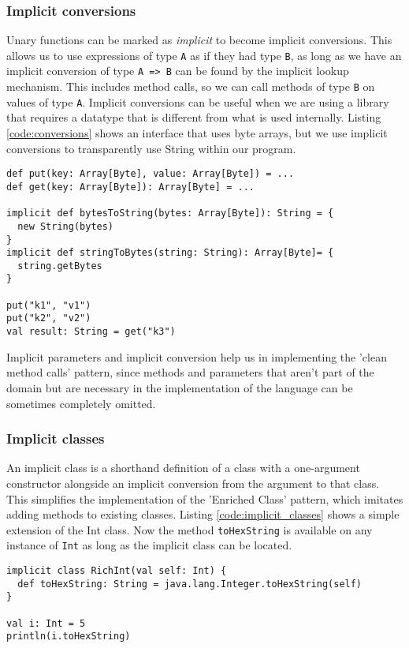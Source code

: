 \subsubsection{Implicit conversions}
Unary functions can be marked as {\it implicit} to become implicit conversions. This allows us to use expressions of type \texttt{A} as if they had type \texttt{B}, as long as we have an implicit conversion of type \texttt{A => B} can be found by the implicit lookup mechanism. This includes method calls, so we can call methods of type \texttt{B} on values of type \texttt{A}. Implicit conversions can be useful when we are using a library that requires a datatype that is different from what is used internally. Listing \ref{code:conversions} shows an interface that uses byte arrays, but we use implicit conversions to transparently use String within our program.

\begin{lstlisting}[caption=Implicit conversions, label=code:conversions, float]
def put(key: Array[Byte], value: Array[Byte]) = ...
def get(key: Array[Byte]): Array[Byte] = ...

implicit def bytesToString(bytes: Array[Byte]): String = {
  new String(bytes)
}
implicit def stringToBytes(string: String): Array[Byte]= {
  string.getBytes
}

put("k1", "v1")
put("k2", "v2")
val result: String = get("k3")
\end{lstlisting}

Implicit parameters and implicit conversion help us in implementing the 'clean method calls' pattern, since methods and parameters that aren't part of the domain but are necessary in the implementation of the language can be sometimes completely omitted.

\subsubsection{Implicit classes}
An implicit class is a shorthand definition of a class with a one-argument constructor alongside an implicit conversion from the argument to that class. This simplifies the implementation of the 'Enriched Class' pattern, which imitates adding methods to existing classes. Listing \ref{code:implicit_classes} shows a simple extension of the Int class. Now the method \texttt{toHexString} is available on any instance of \texttt{Int} as long as the implicit class can be located.

\begin{lstlisting}[caption=Implicit class, label=code:implicit_classes, float]
implicit class RichInt(val self: Int) {
  def toHexString: String = java.lang.Integer.toHexString(self)
}

val i: Int = 5
println(i.toHexString)
\end{lstlisting}


